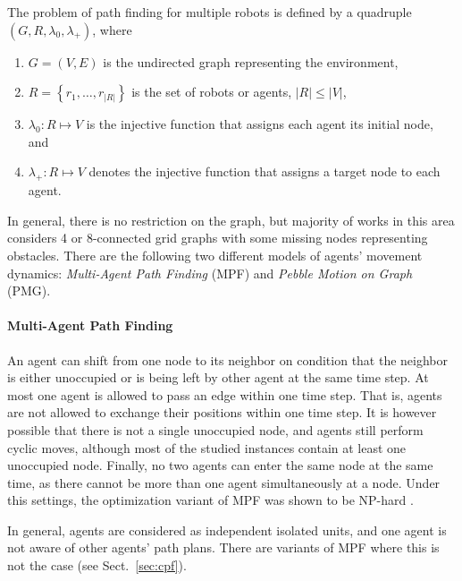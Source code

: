The problem of path finding for multiple robots is defined by a quadruple $(G,R,\lambda_0,\lambda_+)$, where
\begin{enumerate}
	\item $G=(V,E)$ is the undirected graph representing the environment,
	\item $R=\left\{r_1,\dots,r_{|R|}\right\}$ is the set of robots or agents, $|R|\leq|V|$,
	\item $\lambda_0:R\mapsto V$ is the injective function that assigns each agent its initial node, and
	\item $\lambda_+:R\mapsto V$ denotes the injective function that assigns a target node to each agent.
\end{enumerate}
In general, there is no restriction on the graph, but majority of works in this area considers 4 or 8-connected grid graphs with some missing nodes representing obstacles.
There are the following two different models of agents' movement dynamics: \emph{Multi-Agent Path Finding} (MPF) and \emph{Pebble Motion on Graph} (PMG).

\paragraph{Multi-Agent Path Finding}
An agent can shift from one node to its neighbor on condition that the neighbor is either unoccupied or is being left by other agent at the same time step. 
At most one agent is allowed to pass an edge within one time step. 
That is, agents are not allowed to exchange their positions within one time step.
It is however possible that there is not a single unoccupied node, and agents still perform cyclic moves, although most of the studied instances contain at least one unoccupied node.
Finally, no two agents can enter the same node at the same time, as there cannot be more than one agent simultaneously at a node.
Under this settings, the optimization variant of MPF was shown to be NP-hard \cite{surynek10}.

In general, agents are considered as independent isolated units, and one agent is not aware of other agents' path plans.
There are variants of MPF where this is not the case (see Sect.~\ref{sec:cpf}).

